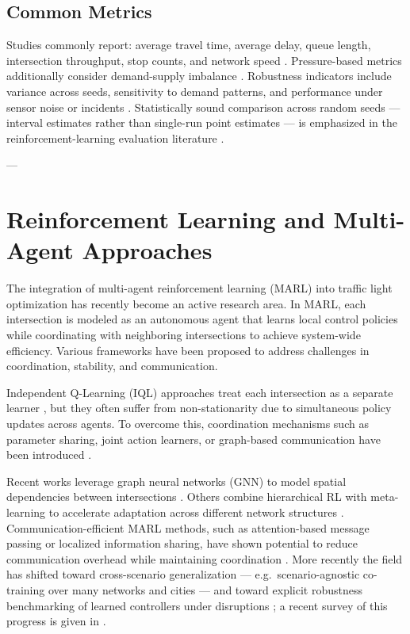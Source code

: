 \documentclass[12pt]{report} %
\begin{document}
\subsection*{Common Metrics}
Studies commonly report: average travel time, average delay, queue length, intersection throughput, stop counts, and network speed \cite{AdaptiveReview_2023,DRL_Transportation_2023}. Pressure-based metrics additionally consider demand-supply imbalance \cite{MaxPressure_2013,CoordinatedDQL_2022}. Robustness indicators include variance across seeds, sensitivity to demand patterns, and performance under sensor noise or incidents \cite{Du_2023,Rodrigues_2019}. Statistically sound comparison across random seeds --- interval estimates rather than single-run point estimates --- is emphasized in the reinforcement-learning evaluation literature \cite{Henderson_2018,Agarwal_2021,Colas_2018}.

---

\section{Reinforcement Learning and Multi-Agent Approaches}

The integration of multi-agent reinforcement learning (MARL) into traffic light optimization has recently become an active research area. In MARL, each intersection is modeled as an autonomous agent that learns local control policies while coordinating with neighboring intersections to achieve system-wide efficiency. Various frameworks have been proposed to address challenges in coordination, stability, and communication.

Independent Q-Learning (IQL) approaches treat each intersection as a separate learner \cite{IQLTraffic2021}, but they often suffer from non-stationarity due to simultaneous policy updates across agents. To overcome this, coordination mechanisms such as parameter sharing, joint action learners, or graph-based communication have been introduced \cite{GraphRL2023,CooperativeRL2022,Chu2019MA2C}.  

Recent works leverage graph neural networks (GNN) to model spatial dependencies between intersections \cite{GNN_Traffic2022,GraphLight2023}. Others combine hierarchical RL with meta-learning to accelerate adaptation across different network structures \cite{MetaTraffic2023,HierRL2022}. Communication-efficient MARL methods, such as attention-based message passing or localized information sharing, have shown potential to reduce communication overhead while maintaining coordination \cite{CommRL2023,AttentionMARL2024}. More recently the field has shifted toward cross-scenario generalization --- e.g.\ scenario-agnostic co-training over many networks and cities \cite{Jiang_GESA_2024} --- and toward explicit robustness benchmarking of learned controllers under disruptions \cite{Nguyen_TREX_2025}; a recent survey of this progress is given in \cite{Xiao_2025}.
\end{document}
